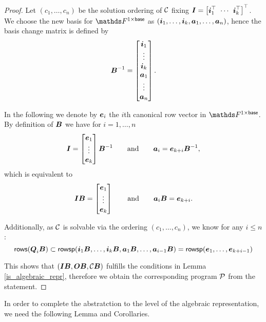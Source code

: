 \begin{proof}
Let $(c_1, \dots, c_n)$ be the solution ordering of $\C$ fixing $\I = \mtdts \vi k$.
We choose the new basis for $\Frowsp$ as $(\dts \vi k, \dts \va n)$, hence the basis change matrix is defined by
\[
    \B^{-1} = 
    \begin{bmatrix}
\vi_1 \\
\vdots \\
\vi_k \\
\va_1 \\
\vdots \\
\va_n
    \end{bmatrix}.
\]

In the following we denote by $\v e_i$ the $i$th canonical row vector in $\Frowsp$.
By definition of $\B$ we have for $i=1, \dots, n$
\begin{equation*}
\I = \begin{bmatrix}
    \v e_1 \\
    \vdots \\
    \v e_k
\end{bmatrix} \B^{-1}
\qquad \textrm{and} \qquad
\va_i = \v e_{k+i} \B^{-1},
\end{equation*}
which is equivalent to
\begin{equation*}
\I \B = \begin{bmatrix}
    \v e_1 \\
    \vdots \\
    \v e_k
\end{bmatrix}
\qquad \textrm{and} \qquad
\va_i \B = \v e_{k+i}.
\end{equation*}

Additionally, as $\C$ is solvable via the ordering $(c_1, \dots, c_n)$,
we know for any $i \leq n$:
\[
\rows(\Q_i \B) \subset \rowsp(\vi_1 \B, \dots, \vi_k \B, \va_1 \B, \dots, \va_{i-1} \B) = \rowsp(\dts \ve {k+i-1})
\]

This shows that $(\I\B, \O\B, \C\B)$ fulfills the conditions in Lemma \ref{is_algebraic_repr},
therefore we obtain the corresponding program $\P$ from the statement.
\end{proof}

In order to complete the abstratction to the level of the algebraic representation,
we need the following Lemma and Corollaries.

